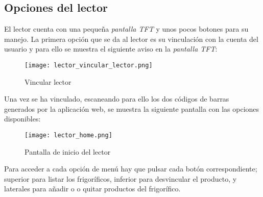 \subsection{Opciones del lector}

El lector cuenta con una pequeña \emph{pantalla TFT} y unos pocos botones para su manejo. La primera opción que se da al lector es su vinculación con la cuenta del usuario y para ello se muestra el siguiente aviso en la \emph{pantalla TFT}:

\begin{figure}[H]
    \centering
    \texttt{[image: lector\_vincular\_lector.png]}
    \caption{Vincular lector}\label{fig:lector_vincular_lector}
\end{figure}

Una vez se ha vinculado, escaneando para ello los dos códigos de barras generados por la aplicación web, se muestra la siguiente pantalla con las opciones disponibles:

\begin{figure}[H]
    \centering
    \texttt{[image: lector\_home.png]}
    \caption{Pantalla de inicio del lector}\label{fig:lector_home}
\end{figure}

Para acceder a cada opción de menú hay que pulsar cada botón correspondiente; superior para listar los frigoríficos, inferior para desvincular el producto, y laterales para añadir o o quitar productos del frigorífico.

